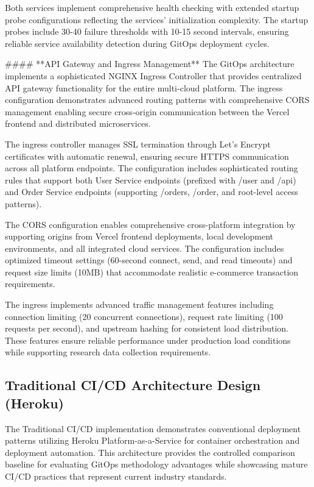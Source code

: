 Both services implement comprehensive health checking with extended startup probe configurations reflecting the services' initialization complexity. The startup probes include 30-40 failure thresholds with 10-15 second intervals, ensuring reliable service availability detection during GitOps deployment cycles.

#### **API Gateway and Ingress Management**
The GitOps architecture implements a sophisticated NGINX Ingress Controller that provides centralized API gateway functionality for the entire multi-cloud platform. The ingress configuration demonstrates advanced routing patterns with comprehensive CORS management enabling secure cross-origin communication between the Vercel frontend and distributed microservices.

The ingress controller manages SSL termination through Let's Encrypt certificates with automatic renewal, ensuring secure HTTPS communication across all platform endpoints. The configuration includes sophisticated routing rules that support both User Service endpoints (prefixed with /user and /api) and Order Service endpoints (supporting /orders, /order, and root-level access patterns).

The CORS configuration enables comprehensive cross-platform integration by supporting origins from Vercel frontend deployments, local development environments, and all integrated cloud services. The configuration includes optimized timeout settings (60-second connect, send, and read timeouts) and request size limits (10MB) that accommodate realistic e-commerce transaction requirements.

The ingress implements advanced traffic management features including connection limiting (20 concurrent connections), request rate limiting (100 requests per second), and upstream hashing for consistent load distribution. These features ensure reliable performance under production load conditions while supporting research data collection requirements.

\subsection{Traditional CI/CD Architecture Design (Heroku)}

The Traditional CI/CD implementation demonstrates conventional deployment patterns utilizing Heroku Platform-as-a-Service for container orchestration and deployment automation. This architecture provides the controlled comparison baseline for evaluating GitOps methodology advantages while showcasing mature CI/CD practices that represent current industry standards.

